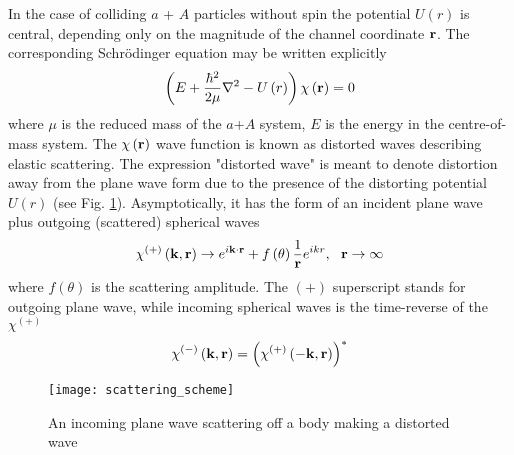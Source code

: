 \documentclass[
12pt, %
oneside, %
english, %
doublespacing, %
doublespacing, %
toctotoc, %
parskip, %
headsepline, %
]{MastersDoctoralThesis} %
\begin{document}
In the case of colliding  $a$ + $A$  particles without spin the potential $U\left( r \right)$ is central, depending only on the magnitude of the channel coordinate ${\bf r}$.
The corresponding Schr\"{o}dinger equation may be written explicitly
\begin{equation}
\left( E + \frac{\hbar^2}{2 \mu} {\bf \nabla}^2 - U \left( r \right) \right) 
\chi \left( {\bf r} \right) =0 
\label{es_she1}
\end{equation}
where $\mu$ is the reduced mass of the $a$+$A$ system, $E$ is the energy in the centre-of-mass system.
The $\chi \left( {\bf r} \right)$ wave function is known as distorted waves describing elastic scattering. The expression "distorted wave" is meant to denote distortion away from the plane wave form due to the presence   of the distorting potential $U \left( r \right)$ (see Fig. \ref{fig:scattering_scheme}). Asymptotically, it has the form of an incident plane wave plus outgoing (scattered) spherical waves
\begin{equation}
\chi^{(+)} \left( {\bf k}, {\bf r} \right) \rightarrow
e^{i {\bf k} \cdot {\bf r}} + f \left( \theta \right) \frac{1}{{\bf r}}
e^{i k r}, ~~  {\bf r} \rightarrow \infty
\label{es_chi_assymp_with_f}
\end{equation}
where $f \left( \theta \right)$ is the scattering amplitude. The $(+)$ superscript stands for outgoing plane wave, while incoming spherical waves is the time-reverse of the $\chi^{(+)}$
\begin{equation}
\chi^{(-)} \left( {\bf k}, {\bf r} \right) = 
\left( \chi^{(+)} \left(- {\bf k}, {\bf r} \right) \right)^{*}
\end{equation}


\begin{figure}
\centering
\texttt{[image: scattering\_scheme]}
\decoRule
\caption{  An incoming plane wave scattering off a body making a distorted wave}
\label{fig:scattering_scheme}
\end{figure}
\end{document}
